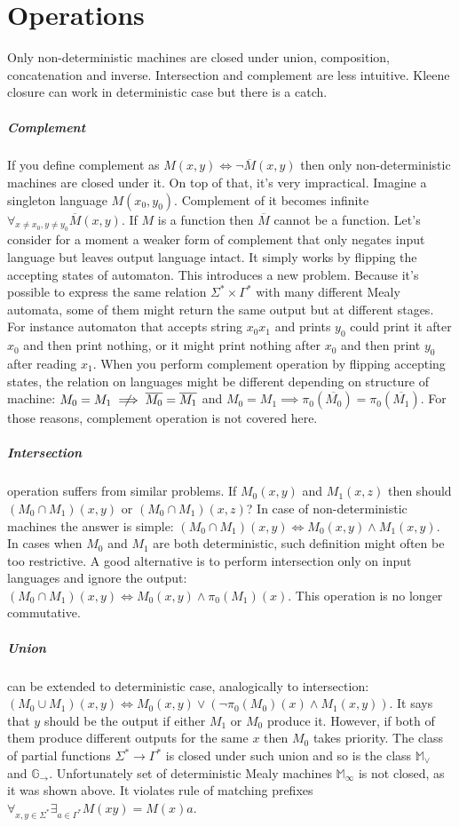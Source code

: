 \documentclass[12pt]{article}
\begin{document}
\section{Operations} Only non-deterministic machines are closed under union, composition, concatenation and inverse. Intersection and complement are less intuitive. Kleene closure can work in deterministic case but there is a catch.
\subparagraph{Complement} If you define complement as $M(x,y) \iff \neg \overline{M}(x,y)$ then only non-deterministic machines are closed under it. On top of that, it's very impractical. Imagine a singleton language $M(x_0,y_0)$. Complement of it becomes infinite $\forall_{x\ne x_0,y\ne y_0} \overline{M}(x,y)$. If $M$ is a function then $\overline{M} $ cannot be a function. Let's consider for a moment a weaker form of complement that only negates input language but leaves output language intact. It simply works by flipping the accepting states of automaton. This introduces a new problem. Because it's possible to express the same relation $\Sigma^* \times \Gamma^*$ with many different Mealy automata, some of them might return the same output but at different stages. For instance automaton that accepts string $x_0x_1$ and prints $y_0$ could print it after $x_0$ and then print nothing, or it might print nothing after $x_0$ and then print $y_0$ after reading $x_1$. When you perform complement operation by flipping accepting states, the relation on languages might be different depending on structure of machine: $M_0 = M_1 \centernot \implies \overline{M_0} = \overline{M_1}$ and $M_0 = M_1  \implies \pi_0(\overline{M_0}) = \pi_0(\overline{M_1})$. For those reasons, complement operation is not covered here.

\subparagraph{Intersection}  operation suffers from similar problems. If $M_0(x,y)$ and $M_1(x,z)$ then should $(M_0 \cap M_1)(x,y)$ or $(M_0 \cap M_1)(x,z)$? In case of non-deterministic machines the answer is simple: $(M_0 \cap M_1)(x,y) \iff M_0(x,y) \wedge M_1(x,y)$. In cases when $M_0$ and $M_1$ are both deterministic, such definition might often be too restrictive. A good alternative is to perform intersection only on input languages and ignore the output: $(M_0 \cap M_1)(x,y) \iff M_0(x,y) \wedge \pi_0(M_1)(x)$. This operation is no longer commutative. 

\subparagraph{Union}  can be extended to deterministic case, analogically to intersection: $(M_0 \cup M_1)(x,y) \iff M_0(x,y) \vee (\neg \pi_0(M_0)(x) \wedge M_1(x,y))$. It says that $y$ should be the output if either $M_1$ or $M_0$ produce it. However, if both of them produce different outputs for the same $x$ then $M_0$ takes priority. The class of partial functions $\Sigma^* \rightarrow \Gamma^*$ is closed  under such union and so is the class $\mathbb{M}_\vee$ and $\mathbb{G}_\rightarrow$. Unfortunately set of deterministic Mealy machines $\mathbb{ M}_\infty$ is not closed, as it was shown above. It violates rule of matching prefixes $\forall_{x,y\in \Sigma^*} \exists_{a \in \Gamma^* } M(xy)=M(x)a$. 
\end{document}
